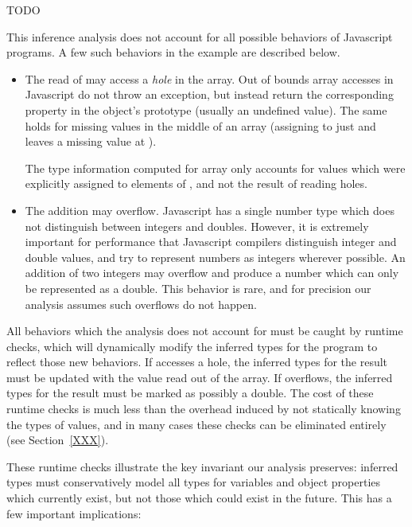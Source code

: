 TODO

This inference analysis does not account for all possible behaviors
of Javascript programs.
A few such behaviors in the example are described below.

\begin{itemize}

\item The read of  may access a {\it hole} in the array.
Out of bounds array accesses in Javascript do not throw an exception,
but instead return the corresponding property in the object's prototype
(usually an undefined value).
The same holds for missing values in the middle of an array
(assigning to just  and  leaves a missing
value at ).

The type information computed for array  only accounts for
values which were explicitly assigned to elements of , and not the
result of reading holes.

\item The addition  may overflow.
Javascript has a single number type which does not distinguish between
integers and doubles.
However, it is extremely important for performance that Javascript compilers
distinguish integer and double values, and try to represent numbers as
integers wherever possible.
An addition of two integers may overflow and produce a number which can
only be represented as a double.
This behavior is rare, and for precision our analysis assumes
such overflows do not happen.

\end{itemize}

All behaviors which the analysis does not account for must be caught
by runtime checks, which will dynamically modify the inferred types
for the program to reflect those new behaviors.
If  accesses a hole, the inferred types for the result must be
updated with the value read out of the array.
If  overflows, the inferred types for the result must be
marked as possibly a double.
The cost of these runtime checks is much less than the overhead induced
by not statically knowing the types of values, and in many cases these
checks can be eliminated entirely (see Section~\ref{XXX}).

These runtime checks illustrate the key invariant our analysis
preserves: inferred types must conservatively model all types for
variables and object properties which currently exist, but not those
which could exist in the future.
This has a few important implications:

